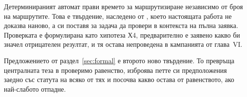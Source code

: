 Детерминираният автомат прави времето за маршрутизиране независимо от броя на маршрутите.
Това е твърдение, наследено от \cite{stankov2024regex}, което настоящата работа не доказва
наново, а си поставя за задача да провери в контекста на пълна заявка. Проверката е
формулирана като хипотеза Х4, предварително е заявено какво би значел отрицателен резултат,
и тя остава непроведена в кампанията от глава~VI.

Предложението от раздел~\ref{sec:formal} е второто ново твърдение. То превръща централната
теза в проверимо равенство, изброява петте си предположения заедно със статута на всяко от
тях и посочва какво остава от равенството, ако най-слабото отпадне.
